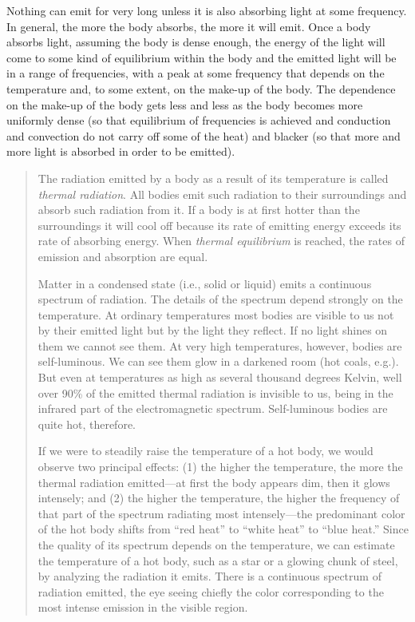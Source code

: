 Nothing can emit for very long unless it is also absorbing light at some
frequency. In general, the more the body absorbs, the more it will emit.
Once a body absorbs light, assuming the body is dense enough, the energy
of the light will come to some kind of equilibrium within the body and
the emitted light will be in a range of frequencies, with a peak at some
frequency that depends on the temperature and, to some extent, on the
make-up of the body. The dependence on the make-up of the body gets less
and less as the body becomes more uniformly dense (so that equilibrium
of frequencies is achieved and conduction and convection do not carry
off some of the heat) and blacker (so that more and more light is
absorbed in order to be emitted).
\begin{quotation}
The radiation emitted by a body as a result of its temperature is called
\emph{thermal radiation}. All bodies emit such radiation to their
surroundings and absorb such radiation from it. If a body is at first
hotter than the surroundings it will cool off because its rate of
emitting energy exceeds its rate of absorbing energy. When \emph{thermal
equilibrium} is reached, the rates of emission and absorption are equal.

Matter in a condensed state (i.e., solid or liquid) emits a continuous
spectrum of radiation. The details of the spectrum depend strongly on
the temperature. At ordinary temperatures most bodies are visible to us
not by their emitted light but by the light they reflect. If no light
shines on them we cannot see them. At very high temperatures, however,
bodies are self-luminous. We can see them glow in a darkened room (hot
coals, e.g.). But even at temperatures as high as several thousand
degrees Kelvin, well over 90\% of the emitted thermal radiation is
invisible to us, being in the infrared part of the electromagnetic
spectrum. Self-luminous bodies are quite hot, therefore.

If we were to steadily raise the temperature of a hot body, we would
observe two principal effects: (1) the higher the temperature, the more
the thermal radiation emitted---at first the body appears dim, then it
glows intensely; and (2) the higher the temperature, the higher the
frequency of that part of the spectrum radiating most intensely---the
predominant color of the hot body shifts from ``red heat'' to ``white
heat'' to ``blue heat.'' Since the quality of its spectrum depends on
the temperature, we can estimate the temperature of a hot body, such as
a star or a glowing chunk of steel, by analyzing the radiation it emits.
There is a continuous spectrum of radiation emitted, the eye seeing
chiefly the color corresponding to the most intense emission in the
visible region.


\end{quotation}
